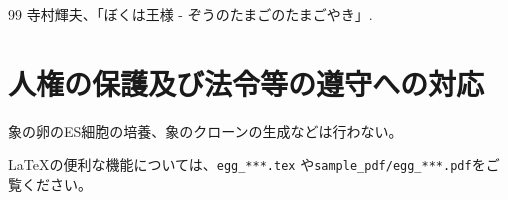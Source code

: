 \documentclass[11pt,a4j,dvipdfmx]{jarticle} 					%
\newcommand{\研究課題名}{象の卵}
\newcommand{\研究機関名}{逢坂大学}
\newcommand{\研究代表者氏名}{湯川秀樹}
\newcommand{\研究期間の最終元号年度}{8}  %
\begin{document}
	\vspace{1cm}
	\begin{thebibliography}{99}
		 寺村輝夫、「ぼくは王様 - ぞうのたまごのたまごやき」.
	\end{thebibliography}




\section{人権の保護及び法令等の遵守への対応}

	象の卵のES細胞の培養、象のクローンの生成などは行わない。

	\LaTeX の便利な機能については、\texttt{egg\_***.tex} や\texttt{sample\_pdf/egg\_***.pdf}をご覧ください。








\end{document}
